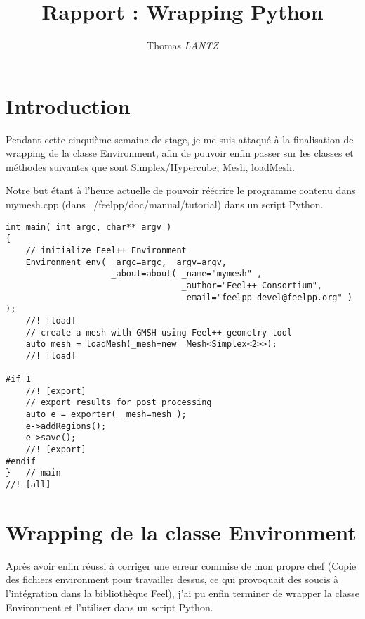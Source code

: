 \documentclass[12pt]{article}
\title {Rapport : Wrapping Python}
\author {Thomas \emph{LANTZ}}
\begin{document}
\maketitle 

\section{Introduction}

Pendant cette cinquième semaine de stage, je me suis attaqué à la finalisation de wrapping de la classe Environment, afin de pouvoir enfin passer sur les classes et méthodes suivantes que sont Simplex/Hypercube, Mesh, loadMesh.

Notre but étant à l'heure actuelle de pouvoir réécrire le programme contenu dans mymesh.cpp
(dans ~/feelpp/doc/manual/tutorial) dans un script Python.

\begin{lstlisting}
int main( int argc, char** argv )
{
    // initialize Feel++ Environment
    Environment env( _argc=argc, _argv=argv,
                     _about=about( _name="mymesh" ,
                                   _author="Feel++ Consortium",
                                   _email="feelpp-devel@feelpp.org" ) );
    //! [load]
    // create a mesh with GMSH using Feel++ geometry tool
    auto mesh = loadMesh(_mesh=new  Mesh<Simplex<2>>);
    //! [load]

#if 1
    //! [export]
    // export results for post processing
    auto e = exporter( _mesh=mesh );
    e->addRegions();
    e->save();
    //! [export]
#endif
}   // main
//! [all]
\end{lstlisting}

\section{Wrapping de la classe Environment}

Après avoir enfin réussi à corriger une erreur commise de mon propre chef (Copie des fichiers environment pour travailler dessus, ce qui provoquait des soucis à l'intégration dans la bibliothèque Feel), j'ai pu enfin terminer de wrapper la classe Environment et l'utiliser dans un script Python.
\end{document}
